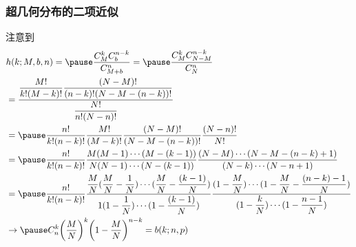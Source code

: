 \begin{frame}
	\frametitle{超几何分布的二项近似}
	注意到
	{\small \begin{align*}
		 & h(k;M,b,n)=\pause \dfrac{C_M^kC_b^{n-k}}{C_{M+b}^n}=\pause \dfrac{C_M^kC_{N-M}^{n-k}}{C_{N}^n}                                                                                                                                                                                \\
		 & =\dfrac{\dfrac{M!}{k!(M-k)!}\dfrac{(N-M)!}{(n-k)!(N-M-(n-k))!}}{\dfrac{N!}{n!(N-n)!}}                                                                                                                                                                                         \\
		 & =\pause \dfrac{n!}{k!(n-k)!}\dfrac{M!}{(M-k)!}\dfrac{(N-M)!}{(N-M-(n-k))!}\dfrac{(N-n)!}{N!}                                                                                                                                                                                  \\
		 & =\pause \dfrac{n!}{k!(n-k)!}\dfrac{M(M-1)\cdots (M-(k-1))}{N(N-1)\cdots (N-(k-1))} \dfrac{(N-M)\cdots (N-M-(n-k)+1)}{(N-k)\cdots (N-n+1)}                                                                                                                                     \\
		 & =\pause \dfrac{n!}{k!(n-k)!}\dfrac{\dfrac{M}{N}(\dfrac{M}{N}-\dfrac{1}{N})\cdots (\dfrac{M}{N}-\dfrac{(k-1)}{N})}{1(1-\dfrac{1}{N})\cdots (1-\dfrac{(k-1)}{N})} \dfrac{(1-\dfrac{M}{N})\cdots (1-\dfrac{M}{N}-\dfrac{(n-k)-1}{N})}{(1-\dfrac{k}{N})\cdots (1-\dfrac{n-1}{N})} \\
		 & \rightarrow \pause C_n^k\bigg(\dfrac{M}{N}\bigg)^k\bigg(1-\dfrac{M}{N}\bigg)^{n-k}=b(k;n,p)
	\end{align*}
	}
\end{frame}
